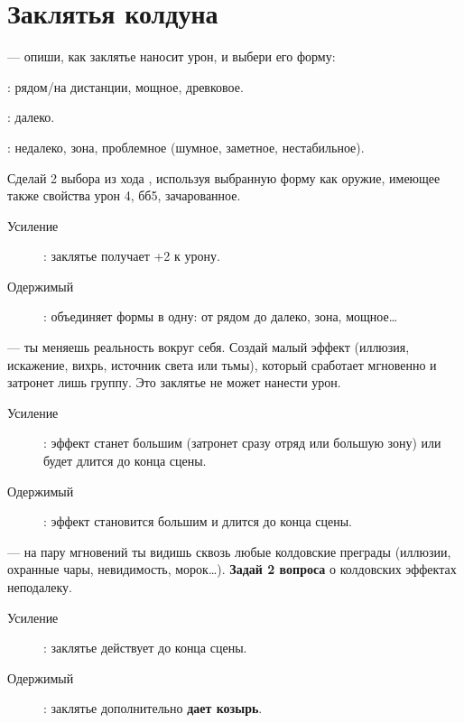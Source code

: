 \documentclass[10pt,twoside]{report}
\begin{document}
\section*{Заклятья колдуна}
\begin{description}[noitemsep]
\item[Слово Смерти]--- опиши, как заклятье наносит урон, и выбери его
  форму:
  \begin{description}[noitemsep]
\item[Коготь]: рядом/на дистанции, мощное, древковое.
\item[Стрела]: далеко.
\item[Вспышка]: недалеко, зона, проблемное (шумное, заметное, нестабильное).
\end{description}
Сделай 2 выбора из хода {}, используя выбранную
форму как оружие, имеющее также свойства урон 4, бб5, зачарованное.
\begin{description}
\item[Усиление]: заклятье получает +2 к урону.
 \item[Одержимый]: объединяет формы в одну: от рядом до далеко, зона,
    мощное\ldots
\end{description}
\vfill  

\item[Слово Искажения]--- ты меняешь реальность вокруг себя. Создай малый
эффект (иллюзия, искажение, вихрь, источник света или тьмы), который
сработает мгновенно и затронет лишь группу. Это заклятье не может
нанести урон.
\begin{description}
 \item[Усиление]: эффект станет большим (затронет сразу отряд
    или большую зону) или будет длится до конца сцены.
 \item[Одержимый]: эффект
   становится большим и длится до конца сцены.
 \end{description}
\vfill
\pagebreak

 \item[Взгляд Бездны]--- на пару мгновений ты видишь сквозь любые
  колдовские преграды (иллюзии, охранные чары, невидимость, морок\ldots). {\bfseries Задай 2 вопроса} о колдовских эффектах неподалеку.
  \begin{description}
  \item[Усиление]: заклятье действует до конца сцены.
  \item[Одержимый]: заклятье дополнительно \textbf{дает козырь}.
  \end{description}
  \vfill



\end{description}
\end{document}
